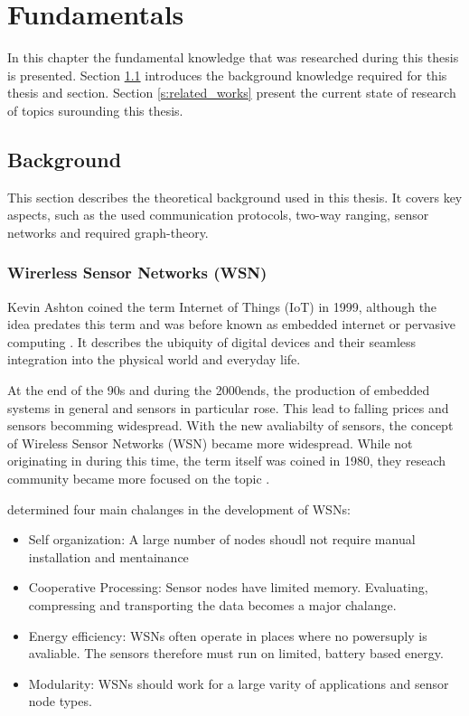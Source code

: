 \chapter{Fundamentals}

In this chapter the fundamental knowledge that was researched during this thesis is presented.
Section \ref{s:background} introduces the background knowledge required for this thesis and section.
Section \ref{s:related_works} present the current state of research of topics surounding this thesis.

\section{Background}
\label{s:background}

This section describes the theoretical background used in this thesis.
It covers key aspects, such as the used communication protocols, two-way ranging, sensor networks and required graph-theory.


\subsection{Wirerless Sensor Networks (WSN)}
\label{S:WSN}
Kevin Ashton coined the term Internet of Things (IoT) in 1999, although the idea predates this term and was before known as embedded internet or pervasive computing \cite{alaba2024evolution}.
It describes the ubiquity of digital devices and their seamless integration into the physical world and everyday life.



At the end of the 90s and during the 2000ends, the production of embedded systems in general and sensors in particular rose.
This lead to falling prices and sensors becomming widespread.
With the new avaliabilty of sensors, the concept of Wireless Sensor Networks (WSN) became more widespread.
While not originating in during this time, the term itself was coined in 1980, they reseach community became more focused on the topic \cite{jindal2018history}.

\cite{jindal2018history} determined four main chalanges in the development of WSNs:
\begin{itemize}
\item Self organization: A large number of nodes shoudl not require manual installation and mentainance
\item Cooperative Processing: Sensor nodes have limited memory. Evaluating, compressing and transporting the data becomes a major chalange.
\item Energy efficiency: WSNs often operate in places where no powersuply is avaliable. The sensors therefore must run on limited, battery based energy.
\item Modularity: WSNs should work for a large varity of applications and sensor node types.
\end{itemize}

